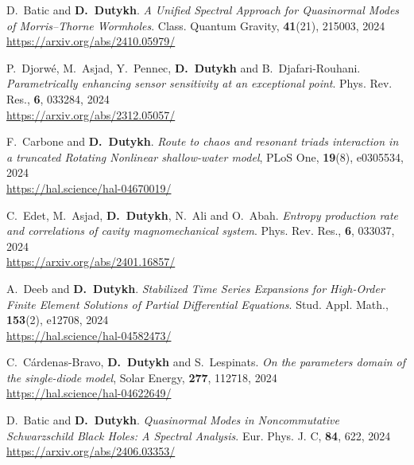\begin{etaremune}
  \item D.~Batic and \textbf{D.~Dutykh}. \textit{A Unified Spectral Approach for Quasinormal Modes of Morris--Thorne Wormholes}. Class. Quantum Gravity, \textbf{41}(21), 215003, 2024 \\ %
  \url{https://arxiv.org/abs/2410.05979/}

  \item P.~Djorw\'e, M.~Asjad, Y.~Pennec, \textbf{D.~Dutykh} and B.~Djafari-Rouhani. \textit{Parametrically enhancing sensor sensitivity at an exceptional point}. Phys. Rev. Res., \textbf{6}, 033284, 2024 \\ %
  \url{https://arxiv.org/abs/2312.05057/}
  
  \item F.~Carbone and \textbf{D.~Dutykh}. \textit{Route to chaos and resonant triads interaction in a truncated Rotating Nonlinear shallow-water model}, PLoS One, \textbf{19}(8), e0305534, 2024 \\ %
  \url{https://hal.science/hal-04670019/}

  \item C.~Edet, M.~Asjad, \textbf{D.~Dutykh}, N.~Ali and O.~Abah. \textit{Entropy production rate and correlations of cavity magnomechanical system}. Phys. Rev. Res., \textbf{6}, 033037, 2024 \\ %
  \url{https://arxiv.org/abs/2401.16857/}

  \item A.~Deeb and \textbf{D.~Dutykh}. \textit{Stabilized Time Series Expansions for High-Order Finite Element Solutions of Partial Differential Equations}. Stud. Appl. Math., \textbf{153}(2), e12708, 2024 \\ %
  \url{https://hal.science/hal-04582473/}
  
  \item C.~C\'ardenas-Bravo, \textbf{D.~Dutykh} and S.~Lespinats. \textit{On the parameters domain of the single-diode model}, Solar Energy, \textbf{277}, 112718, 2024 \\ %
  \url{https://hal.science/hal-04622649/}
  
  \item D.~Batic and \textbf{D.~Dutykh}. \textit{Quasinormal Modes in Noncommutative Schwarzschild Black Holes: A Spectral Analysis}. Eur. Phys. J. C, \textbf{84}, 622, 2024 \\ %
  \url{https://arxiv.org/abs/2406.03353/}


\end{etaremune}
